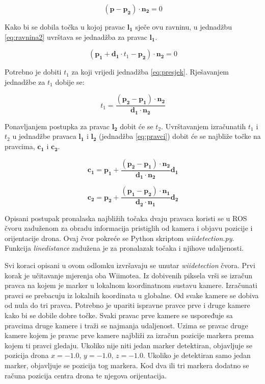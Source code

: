 \documentclass[times, utf8, diplomski]{fer}
\begin{document}
\begin{equation}
(\bm{p} - \bm{p_2})\cdot \bm{n_2} = 0
\label{eq:ravnina2}
\end{equation}

Kako bi se dobila točka u kojoj pravac $\bm{l_1}$ sječe ovu ravninu, u jednadžbu \ref{eq:ravnina2} uvrštava se jednadžba za pravac $\bm{l_1}$.

\begin{equation}
(\bm{p_1} + \bm{d_1}\cdot t_1 - \bm{p_2})\cdot \bm{n_2} = 0
\label{eq:presjek}
\end{equation}

Potrebno je dobiti $t_1$ za koji vrijedi jednadžba \ref{eq:presjek}. Rješavanjem jednadžbe za $t_1$ dobije se:

\begin{equation}
t_1 = \frac{(\bm{p_2} - \bm{p_1})\cdot \bm{n_2}}{\bm{d_1}\cdot\bm{n_2}}
\end{equation}

\vspace{5mm}

Ponavljanjem postupka za pravac $\bm{l_2}$ dobit će se $t_2$. Uvrštavanjem izračunatih $t_1$ i $t_2$ u jednadžbe pravaca $\bm{l_1}$ i $\bm{l_2}$ (jednadžba \ref{eq:pravci}) dobit će se najbliže točke na pravcima, $\bm{c_1}$ i $\bm{c_2}$. \citep{geometryalgs}

\begin{equation}
\bm{c_1} = \bm{p_1} + \frac{(\bm{p_2} - \bm{p_1})\cdot \bm{n_2}}{\bm{d_1}\cdot\bm{n_2}}\bm{d_1}
\end{equation}

\begin{equation}
\bm{c_2} = \bm{p_2} + \frac{(\bm{p_1} - \bm{p_2})\cdot \bm{n_1}}{\bm{d_2}\cdot\bm{n_1}}\bm{d_2}
\end{equation}

\vspace{5mm}
 
Opisani postupak pronalaska najbližih točaka dvaju pravaca koristi se u ROS čvoru zaduženom za obradu informacija pristiglih od kamera i objavu pozicije i orijentacije drona. Ovaj čvor pokreće se Python skriptom \textit{wii\textunderscore detection.py}. Funkcija \textit{line\textunderscore distance} zadužena je za pronalazak točaka i njihove udaljenosti.

Svi koraci opisani u ovom odlomku izvršavaju se unutar \textit{wii\textunderscore detection} čvora. Prvi korak je učitavanje mjerenja oba Wiimotea. Iz dobivenih piksela vrši se izračun pravca na kojem je marker u lokalnom koordinatnom sustavu kamere. Izračunati pravci se prebacuju iz lokalnih koordinata u globalne. Od svake kamere se dobiva od nula do tri pravca. Potrebno je upariti ispravne pravce prve i druge kamere kako bi se dobile dobre točke. Svaki pravac prve kamere se uspoređuje sa pravcima druge kamere i traži se najmanja udaljenost. Uzima se pravac druge kamere kojem je pravac prve kamere najbliži za izračun pozicije markera prema kojem ti pravci gledaju. Ukoliko nije niti jedan marker detektiran, objavljuje se pozicija drona $x=-1.0$, $y=-1.0$, $z=-1.0$. Ukoliko je detektiran samo jedan marker, objavljuje se pozicija tog markera. Kod dva ili tri markera dodatno se računa pozicija centra drona te njegova orijentacija.
 
\end{document}
